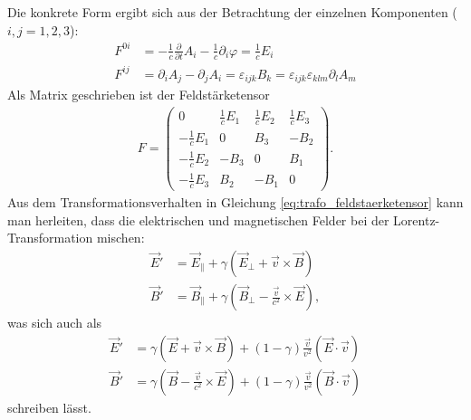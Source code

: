Die konkrete Form ergibt sich aus der Betrachtung der einzelnen Komponenten ($i,j=1,2,3$):
\begin{align*}
    F^{0i} & = -\frac{1}{c} \frac{\partial}{\partial t}A_i-\frac{1}{c}\partial_i \varphi = \frac{1}{c}E_i                \\
    F^{ij} & = \partial_i A_j-\partial_j A_i = \varepsilon_{ijk} B_k = \varepsilon_{ijk} \varepsilon_{klm}\partial_l A_m
\end{align*}
Als Matrix geschrieben ist der Feldstärketensor
\begin{align*}
    F=\begin{pmatrix}
          0               & \frac{1}{c}E_1 & \frac{1}{c}E_2 & \frac{1}{c}E_3 \\
          -\frac{1}{c}E_1 & 0              & B_3            & -B_2           \\
          -\frac{1}{c}E_2 & -B_3           & 0              & B_1            \\
          -\frac{1}{c}E_3 & B_2            & -B_1           & 0
      \end{pmatrix}.
\end{align*}
Aus dem Transformationsverhalten in Gleichung \eqref{eq:trafo_feldstaerketensor} kann man herleiten, dass die elektrischen und magnetischen Felder bei der Lorentz-Transformation mischen:
\begin{align*}
    \vec E' & = \vec E_\parallel + \gamma(\vec E_\perp + \vec v\times \vec B)              \\
    \vec B' & = \vec B_\parallel + \gamma(\vec B_\perp - \frac{\vec v}{c^2}\times \vec E),
\end{align*}
was sich auch als
\begin{align*}
    \vec E' & = \gamma(\vec E + \vec v\times \vec B) +(1-\gamma)\frac{\vec v}{v^2}\left(\vec E\cdot \vec v\right)             \\
    \vec B' & = \gamma(\vec B - \frac{\vec v}{c^2}\times \vec E) +(1-\gamma)\frac{\vec v}{v^2}\left(\vec B\cdot \vec v\right)
\end{align*}
schreiben lässt.

